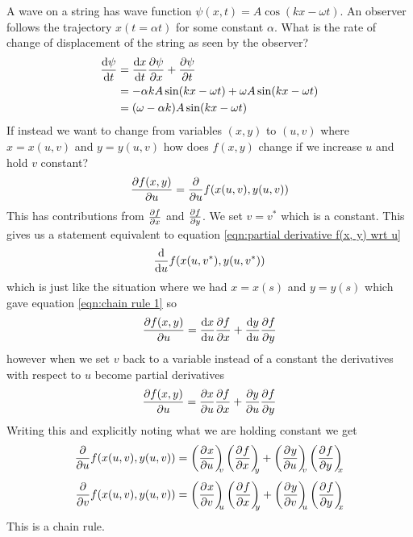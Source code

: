 \documentclass{article}
\begin{document}
    \example
    A wave on a string has wave function \(\psi(x, t) = A\cos(kx - \omega t)\). 
    An observer follows the trajectory \(x(t = \alpha t)\) for some constant \(\alpha\). 
    What is the rate of change of displacement of the string as seen by the observer?
    \begin{align*}
        \dv{\psi}{t} &= \dv{x}{t}\pdv{\psi}{x} + \pdv{\psi}{t}\\
        &= -\alpha kA\sin(kx - \omega t) + \omega A\sin(kx - \omega t)\\
        &= (\omega - \alpha k)A\sin(kx - \omega t)
    \end{align*}
    If instead we want to change from variables \((x, y)\) to \((u, v)\) where \(x = x(u, v)\) and \(y = y(u, v)\) how does \(f(x, y)\) change if we increase \(u\) and hold \(v\) constant?
    \begin{equation}\label{eqn:partial derivative f(x, y) wrt u}
        \pdv{f(x, y)}{u} = \pdv{u} f(x(u, v), y(u, v))
    \end{equation}
    This has contributions from \(\pdv{f}{x}\) and \(\pdv{f}{y}\).
    We set \(v = v^*\) which is a constant.
    This gives us a statement equivalent to equation \ref{eqn:partial derivative f(x, y) wrt u}
    \[\dv{u}f(x(u, v^*), y(u, v^*))\]
    which is just like the situation where we had \(x = x(s)\) and \(y = y(s)\) which gave equation \ref{eqn:chain rule 1} so
    \[\pdv{f(x, y)}{u} = \dv{x}{u}\pdv{f}{x} + \dv{y}{u}\pdv{f}{y}\]
    however when we set \(v\) back to a variable instead of a constant the derivatives with respect to \(u\) become partial derivatives
    \[\pdv{f(x, y)}{u} = \pdv{x}{u}\pdv{f}{x} + \pdv{y}{u}\pdv{f}{y}\]
    Writing this and explicitly noting what we are holding constant we get
    \[\pdv{u} f(x(u, v), y(u, v)) = \pdvconst{x}{u}{v}\pdvconst{f}{x}{y} + \pdvconst{y}{u}{v}\pdvconst{f}{y}{x}\]
    \[\pdv{v} f(x(u, v), y(u, v)) = \pdvconst{x}{v}{u}\pdvconst{f}{x}{y} + \pdvconst{y}{v}{u}\pdvconst{f}{y}{x}\]
    This is a chain rule.
    
\end{document}
